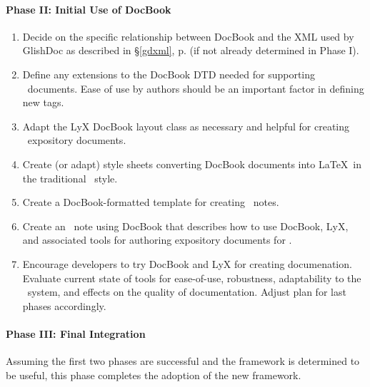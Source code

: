 \paragraph{Phase II: Initial Use of DocBook}

\begin{enumerate} 

\item Decide on the specific relationship between DocBook and the XML
used by GlishDoc as described in \S\ref{gdxml}, p. \pageref{pg-gdxml} (if
not already determined in Phase I).  

\item Define any extensions to the DocBook DTD needed for supporting
\aipspp\ documents.  Ease of use by authors should be an important
factor in defining new tags.

\item Adapt the LyX DocBook layout class as necessary and helpful for
creating \aipspp\ expository documents.

\item Create (or adapt) style sheets converting DocBook documents into
\LaTeX\ in the traditional \aipspp\ style.  

\item Create a DocBook-formatted template for creating \aipspp\ notes.  

\item Create an \aipspp\ note using DocBook that describes how to use
DocBook, LyX, and associated tools for authoring expository documents
for \aipspp.  

\item Encourage developers to try DocBook and LyX for creating
documenation.  Evaluate current state of tools for ease-of-use,
robustness, adaptability to the \aipspp\ system, and effects on the
quality of documentation.  Adjust plan for last phases accordingly.

\end{enumerate}

\paragraph{Phase III: Final Integration}  

Assuming the first two phases are successful and the framework is
determined to be useful, this phase completes the adoption of the new
framework.  

